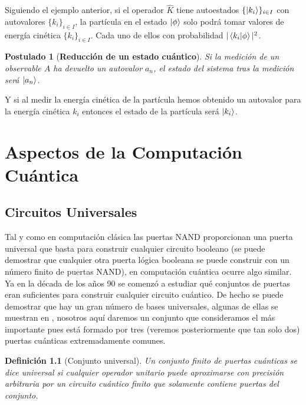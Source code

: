 \documentclass[11pt, spanish]{report}
\numberwithin{equation}{section}
\newtheorem{defin}{Definición}[section]
\newtheorem{postu}{Postulado}
\numberwithin{defin}{section}
\begin{document}
\begin{appendices}
Siguiendo el ejemplo anterior, si el operador $\hat{K}$ tiene autoestados $\{\ket{k_i}\}_{i\in I}$ con autovalores $\{k_i\}_{i\in I}$, la partícula en el estado $\ket{\phi}$ solo podrá tomar valores de energía cinética $\{k_i\}_{i\in I}$. Cada uno de ellos con probabilidad $|\bra{k_i}\ket{\phi}|^2$.

\begin{postu}[\textbf{Reducción de un estado cuántico}] \label{post:7} Si la medición de un observable $A$ ha devuelto un autovalor $a_n$, el estado del sistema tras la medición será $\ket{a_n}$. 
\end{postu}

Y si al medir la energía cinética de la partícula hemos obtenido un autovalor para la energía cinética $k_i$ entonces el estado de la partícula será $\ket{k_i}$.

\chapter{Aspectos de la Computación Cuántica}

\section{Circuitos Universales}\label{sec.univ}

Tal y como en computación clásica las puertas NAND proporcionan una puerta universal que basta para construir cualquier circuito booleano (se puede demostrar que cualquier otra puerta lógica booleana se puede construir con un número finito de puertas NAND), en computación cuántica ocurre algo similar. Ya en la década de los años 90 se comenzó a estudiar \cite{1995PhRvA..52.3457B} qué conjuntos de puertas eran suficientes para construir cualquier circuito cuántico. De hecho se puede demostrar que hay un gran número de bases universales, algunas de ellas se muestran en \cite{brylinski2002universal}, nosotros aquí daremos un conjunto que consideramos el más importante pues está formado por tres (veremos posteriormente que tan solo dos) puertas cuánticas extremadamente comunes.\\

\begin{defin}[Conjunto universal] Un conjunto finito de puertas cuánticas se dice universal si cualquier operador unitario puede aproximarse con precisión arbitraria por un circuito cuántico finito que solamente contiene puertas del conjunto.
\end{defin} 


\end{appendices}
\end{document}
